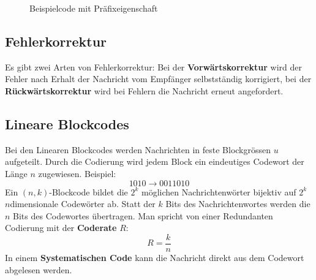 \begin{figure}[H]
	\caption{Beispielcode mit Präfixeigenschaft}
\end{figure}


\subsection{Fehlerkorrektur}

Es gibt zwei Arten von Fehlerkorrektur: Bei der \textbf{Vorwärtskorrektur} wird
der Fehler nach Erhalt der Nachricht vom Empfänger selbstständig korrigiert, bei
der \textbf{Rückwärtskorrektur} wird bei Fehlern die Nachricht erneut
angefordert.


\subsection{Lineare Blockcodes}

Bei den Linearen Blockcodes werden Nachrichten in feste Blockgrössen $u$
aufgeteilt. Durch die Codierung wird jedem Block ein eindeutiges Codewort der
Länge $n$ zugewiesen.
Beispiel:
\[
	1010 \rightarrow 0011010
\]
Ein $(n,k)$-Blockcode bildet die $2^k$ möglichen Nachrichtenwörter bijektiv auf
$2^k$ $n$dimensionale Codewörter ab. Statt der $k$ Bits des Nachrichtenwortes
werden die $n$ Bits des Codewortes übertragen. Man spricht von einer Redundanten
Codierung mit der \textbf{Coderate} $R$:
\[
	R = \frac{k}{n}
\]
In einem \textbf{Systematischen Code} kann die Nachricht direkt aus dem Codewort
abgelesen werden.

